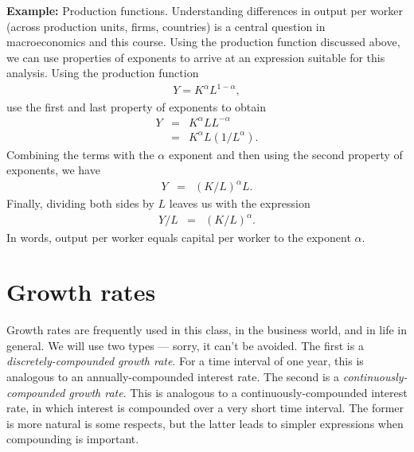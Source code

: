 \textbf{Example:} Production functions.
Understanding differences  in output per worker (across production units, firms, countries) is a central question in macroeconomics and this course. Using the production function discussed above, we can use properties of exponents to arrive at an expression suitable for this analysis. Using the production function
\begin{eqnarray*}
    Y = K^{\alpha} L^{1-\alpha},
\end{eqnarray*}
use the first and last property of exponents to obtain
\begin{eqnarray*}
    Y &=& K^{\alpha} L L^{-\alpha} \\
      &=& K^{\alpha} L ({1}/{L^{\alpha}}).
\end{eqnarray*}
Combining the terms with the $\alpha$ exponent and then using the second property of exponents, we have
\begin{eqnarray*}
     Y &=& \left( {K}/{L} \right)^{\alpha} L.
\end{eqnarray*}
Finally, dividing both sides by $L$ leaves us with the expression
\begin{eqnarray*}
     {Y}/{L} &=& \left( {K}/{L} \right)^{\alpha}.
\end{eqnarray*}
In words, output per worker equals capital per worker to the exponent $\alpha$.

\section{Growth rates}
\label{sec:growth_math}

Growth rates
 are frequently used in this class, in the business world, and in life in general.
We will use two types --- sorry, it can't be avoided.
The first is a \emph{discretely-compounded growth rate}.
For a time interval of one year, this is analogous to an annually-compounded interest rate.
The second is a {\it continuously-compounded   growth rate\/}.
This is analogous to a continuously-compounded   interest rate,
in which interest is compounded over a very short time interval.
The former is more natural is some respects,
but the latter leads to simpler expressions when compounding is important.

